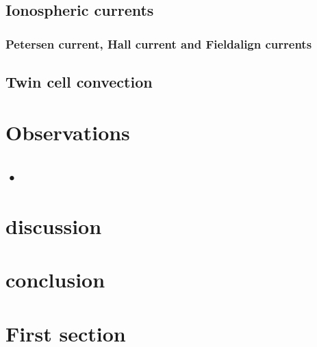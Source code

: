 \documentclass[10pt,a4paper]{article}
\begin{document}
\subsection{Ionospheric currents}
\subsubsection{Petersen current, Hall current and Fieldalign currents}

\subsection{Twin cell convection}

\section{Observations}

\subsection{•}

\section{discussion}

\section{conclusion}


\section{First section}
 
\end{document}
